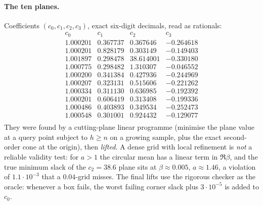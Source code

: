 \paragraph{The ten planes.} Coefficients $(c_0,c_1,c_2,c_3)$, exact six-digit decimals, read as rationals:
\[
\begin{array}{cccc}
c_0&c_1&c_2&c_3\\\hline
1.000201 & 0.367737 & 0.367646 & -0.264618\\
1.000201 & 0.828179 & 0.303149 & -0.149403\\
1.001897 & 0.298478 & 38.614001 & -0.330180\\
1.000775 & 0.298482 & 1.310307 & -0.046552\\
1.000200 & 0.341384 & 0.427936 & -0.244969\\
1.000207 & 0.323131 & 0.515606 & -0.221262\\
1.000334 & 0.311130 & 0.636985 & -0.192392\\
1.000201 & 0.606419 & 0.313408 & -0.199336\\
1.000486 & 0.403893 & 0.349534 & -0.252473\\
1.000548 & 0.301001 & 0.924432 & -0.129077\\
\end{array}
\]
They were found by a cutting-plane linear programme (minimise the plane value at a query point subject to $h\ge n$ on a growing sample, plus the exact
second-order cone at the origin), then \emph{lifted}. A dense grid with local refinement is \emph{not} a reliable validity test: for $a>1$ the circular mean has
a linear term in $\Re\beta$, and the true minimum slack of the $c_2=38.6$ plane sits at $\beta\approx0.005$, $a\approx1.46$, a violation of $1.1\cdot10^{-3}$ that a
$0.04$-grid misses. The final lifts use the rigorous checker as the oracle: whenever a box fails, the worst failing corner slack plus $3\cdot10^{-5}$ is added to $c_0$.

